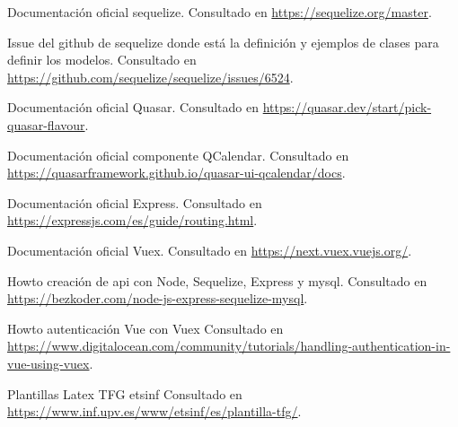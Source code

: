 \documentclass[11pt,spanish,listoffigures,listoftables]{tfgetsinf}
\begin{document}
\begin{thebibliography}{10}

   Documentación oficial sequelize.
   \newblock Consultado en 
   \url{https://sequelize.org/master}.

   Issue del github de sequelize donde está la definición y ejemplos de clases para definir los modelos.
   \newblock Consultado en
   \url{https://github.com/sequelize/sequelize/issues/6524}.

   Documentación oficial Quasar.
   \newblock Consultado en 
   \url{https://quasar.dev/start/pick-quasar-flavour}.

   Documentación oficial componente QCalendar.
   \newblock Consultado en 
   \url{https://quasarframework.github.io/quasar-ui-qcalendar/docs}.

   Documentación oficial Express.
   \newblock Consultado en 
   \url{https://expressjs.com/es/guide/routing.html}.

  Documentación oficial Vuex.
   \newblock Consultado en 
   \url{https://next.vuex.vuejs.org/}.

   Howto creación de api con Node, Sequelize, Express y mysql.
   \newblock Consultado en
   \url{https://bezkoder.com/node-js-express-sequelize-mysql}.

   Howto autenticación Vue con Vuex
   \newblock Consultado en
   \url{https://www.digitalocean.com/community/tutorials/handling-authentication-in-vue-using-vuex}.

   Plantillas Latex TFG etsinf
   \newblock Consultado en
   \url{https://www.inf.upv.es/www/etsinf/es/plantilla-tfg/}.

   

\end{thebibliography}
\cleardoublepage









\end{document}
